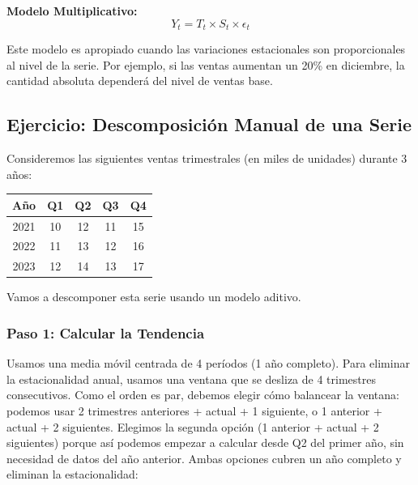 \documentclass[12pt]{article}
\begin{document}
\vspace{0.5em}

\textbf{Modelo Multiplicativo:}
\[
Y_t = T_t \times S_t \times \epsilon_t
\]

Este modelo es apropiado cuando las variaciones estacionales son proporcionales al nivel de la serie. Por ejemplo, si las ventas aumentan un 20\% en diciembre, la cantidad absoluta dependerá del nivel de ventas base.

\subsection{Ejercicio: Descomposición Manual de una Serie}

Consideremos las siguientes ventas trimestrales (en miles de unidades) durante 3 años:

\begin{center}
\begin{tabular}{|c|c|c|c|c|}
\hline
\textbf{Año} & \textbf{Q1} & \textbf{Q2} & \textbf{Q3} & \textbf{Q4} \\
\hline
2021 & 10 & 12 & 11 & 15 \\
2022 & 11 & 13 & 12 & 16 \\
2023 & 12 & 14 & 13 & 17 \\
\hline
\end{tabular}
\end{center}

Vamos a descomponer esta serie usando un modelo aditivo.

\subsubsection{Paso 1: Calcular la Tendencia}

Usamos una media móvil centrada de 4 períodos (1 año completo). Para eliminar la estacionalidad anual, usamos una ventana que se desliza de 4 trimestres consecutivos. Como el orden es par, debemos elegir cómo balancear la ventana: podemos usar 2 trimestres anteriores + actual + 1 siguiente, o 1 anterior + actual + 2 siguientes. Elegimos la segunda opción (1 anterior + actual + 2 siguientes) porque así podemos empezar a calcular desde Q2 del primer año, sin necesidad de datos del año anterior. Ambas opciones cubren un año completo y eliminan la estacionalidad:
\end{document}
